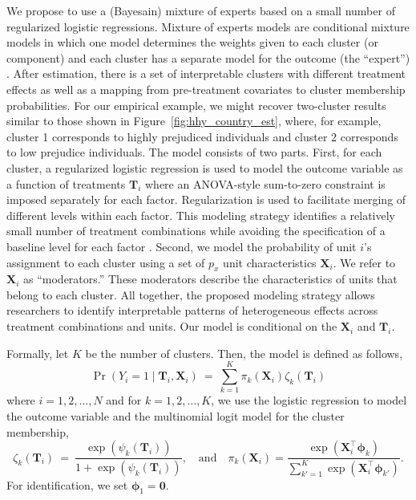 \documentclass[11pt]{article}
\newcommand\bT{\bm{T}}
\newcommand\bX{\bm{X}}
\newcommand\bphi{\bm{\phi}}
\newcommand\bzero{\bm{0}}
\begin{document}
We propose to use a (Bayesain) mixture of experts based on a small number of regularized logistic regressions.
Mixture of experts models are conditional mixture models in which one model determines the weights given to each cluster (or component) and each cluster has a separate model for the outcome (the ``expert'') \citep[see][for a recent review]{gormley2019mixture}. After estimation, there is a set of interpretable clusters with different treatment effects as well as a mapping from pre-treatment covariates to cluster membership probabilities. For our empirical example, we might recover two-cluster results similar to those shown in Figure~\ref{fig:hhy_country_est}, where, for example, cluster 1 corresponds to highly prejudiced individuals and cluster 2 corresponds to low prejudice individuals.
The model consists of two parts.  First,
for each cluster, a regularized logistic regression is used to model
the outcome variable as a function of treatments $\bT_i$ where an
ANOVA-style sum-to-zero constraint is imposed separately for each
factor.  Regularization is used to facilitate merging of different
levels within each factor.  This modeling strategy identifies a
relatively small number of treatment combinations while avoiding the
specification of a baseline level for each factor
\citep{egam:imai:19}. Second, we model the probability of unit $i$'s
assignment to each cluster using a set of $p_x$ unit characteristics
$\bX_i$.
 We refer to $\bX_i$ as ``moderators.''
 These moderators describe the characteristics of units that belong to each cluster.
All together, the proposed modeling strategy allows researchers to identify interpretable patterns of heterogeneous effects across treatment combinations and units.
Our model is conditional on the $\bX_i$ and $\bT_i$.

Formally, let $K$ be the number of clusters.  Then, the model is
defined as follows,
\begin{equation}
\label{eq:unreg}
\Pr(Y_i = 1 \mid \bT_i, \bX_i) \ = \   \sum_{k=1}^K \pi_{k}(\bX_i)
\zeta_{k}(\bT_i) 
\end{equation}
where $i=1,2,\ldots,N$ and for $k=1,2,\ldots,K$, we use the logistic
regression to model the outcome variable and the multinomial logit
model for the cluster membership,
\begin{equation}
  \zeta_{k}(\bT_i) \
= \ \frac{\exp(\psi_{k}(\bT_i))}{1+\exp(\psi_{k}(\bT_i))}, \quad
\text{and} \quad
\pi_{k}(\bX_i) = \frac{\exp(\bX_i^\top \bphi_k)}{\sum_{k'=1}^K
  \exp(\bX_i^\top \bphi_{k'})}. \label{eq:basic_models}
\end{equation}
For identification, we set $\bphi_1 = \bzero$.
\end{document}
